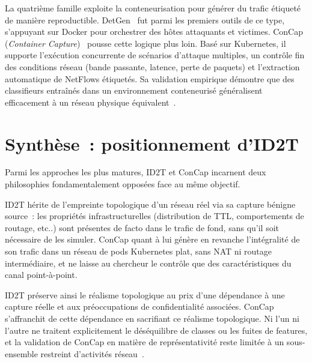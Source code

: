 \documentclass[12pt, a4paper]{report}
\begin{document}
La quatrième famille exploite la conteneurisation pour générer du trafic étiqueté de manière
reproductible. DetGen~\cite{detgen2021} fut parmi les premiers outils de ce type, s'appuyant
sur Docker pour orchestrer des hôtes attaquants et victimes.
ConCap (\textit{Container Capture})~\cite{concap2026} pousse cette logique plus loin. Basé
sur Kubernetes, il supporte l'exécution concurrente de scénarios d'attaque multiples, un contrôle
fin des conditions réseau (bande passante, latence, perte de paquets) et l'extraction automatique
de NetFlows étiquetés. Sa validation empirique démontre que des classifieurs entraînés dans un
environnement conteneurisé généralisent efficacement à un réseau physique équivalent~\cite{concap2026}.
 
\section{Synthèse~: positionnement d'ID2T}
 
Parmi les approches les plus matures, ID2T et ConCap incarnent deux philosophies fondamentalement
opposées face au même objectif.
 
ID2T hérite de l'empreinte topologique d'un réseau réel via sa capture bénigne source~: les
propriétés infrastructurelles (distribution de TTL, comportements de routage, etc..) sont présentes
de facto dans le trafic de fond, sans qu'il soit nécessaire de les simuler. ConCap quant à lui génère
en revanche l'intégralité de son trafic dans un réseau de pods Kubernetes plat, sans NAT ni
routage intermédiaire, et ne laisse au chercheur le contrôle que des caractéristiques du
canal point-à-point.
 
ID2T préserve ainsi le réalisme topologique au prix d'une dépendance à une capture réelle et aux préoccupations de confidentialité associées. ConCap s'affranchit de cette dépendance en sacrifiant ce réalisme topologique. Ni l'un ni l'autre ne traitent explicitement le déséquilibre de classes ou les fuites de features, et la validation de ConCap en matière de représentativité reste limitée à un sous-ensemble restreint d'activités réseau~\cite{concap2026}.
 
\end{document}

